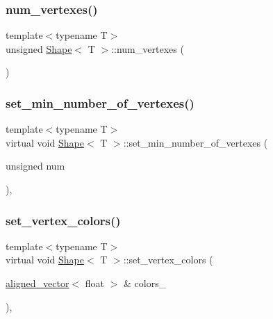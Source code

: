\mbox{\label{classShape_a131e85c7f5cad85bffb92e6719117cab}} 
\subsubsection{\texorpdfstring{num\+\_\+vertexes()}{num\_vertexes()}}
{\footnotesize\ttfamily template$<$typename T$>$ \\
unsigned \mbox{\hyperlink{classShape}{Shape}}$<$ T $>$\+::num\+\_\+vertexes (\begin{DoxyParamCaption}{ }\end{DoxyParamCaption})\hspace{0.3cm}{\ttfamily [inline]}}

\mbox{\label{classShape_ac5a35fe1b2ecb8fcfc050a31c8969805}} 
\subsubsection{\texorpdfstring{set\+\_\+min\+\_\+number\+\_\+of\+\_\+vertexes()}{set\_min\_number\_of\_vertexes()}}
{\footnotesize\ttfamily template$<$typename T$>$ \\
virtual void \mbox{\hyperlink{classShape}{Shape}}$<$ T $>$\+::set\+\_\+min\+\_\+number\+\_\+of\+\_\+vertexes (\begin{DoxyParamCaption}\item[{unsigned}]{num }\end{DoxyParamCaption})\hspace{0.3cm}{\ttfamily [inline]}, {\ttfamily [virtual]}}

\mbox{\label{classShape_a69dabd50440dba1ac463ad6819cdb506}} 
\subsubsection{\texorpdfstring{set\+\_\+vertex\+\_\+colors()}{set\_vertex\_colors()}}
{\footnotesize\ttfamily template$<$typename T$>$ \\
virtual void \mbox{\hyperlink{classShape}{Shape}}$<$ T $>$\+::set\+\_\+vertex\+\_\+colors (\begin{DoxyParamCaption}\item[{\mbox{\hyperlink{type__definitions_8hpp_accb98a876f193a416d9c8a02fe22d526}{aligned\+\_\+vector}}$<$ float $>$ \&}]{colors\+\_\+ }\end{DoxyParamCaption})\hspace{0.3cm}{\ttfamily [inline]}, {\ttfamily [virtual]}}



